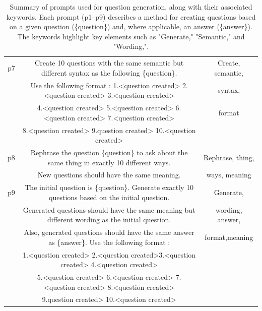 \begin{table}[!t]
{\begin{tabular}{|c|c|c|}
    p7 & Create 10 questions with the same semantic but different syntax as the following \{question\}.&Create, semantic,\\
    &Use the following format : 1.\textless{}question created\textgreater{} 2.\textless{}question created\textgreater{} 3.\textless{}question created\textgreater{}&syntax,\\
    & 4.\textless{}question created\textgreater{} 5.\textless{}question created\textgreater{} 6.\textless{}question created\textgreater{} 7.\textless{}question created\textgreater{}&format\\ 
    & 8.\textless{}question created\textgreater{} 9.\textbf{}question created\textgreater{} 10.\textless{}question created\textgreater{}&\\
    \hline

    p8 & Rephrase the question \{question\} to ask about the same thing in exactly 10 different ways.&Rephrase, thing,\\ 
    &New questions should have the same meaning.&ways, meaning\\
    \hline

    p9 & The initial question is \{question\}. Generate exactly 10 questions based on the initial question.&Generate,\\
    &Generated questions should have the same meaning but different wording as the initial question.&wording, answer,\\ 
    &Also, generated questions should have the same answer as \{answer\}. Use the following format :&format,meaning\\
    &1.\textless{}question created\textgreater{} 2.\textless{}question created\textgreater{}3.\textless{}question created\textgreater{} 4.\textless{}question created\textgreater{}&\\ 
    &5.\textless{}question created\textgreater{} 6.\textless{}question created\textgreater{} 7.\textless{}question created\textgreater{} 8.\textless{}question created\textgreater{}&\\ &9.\textbf{}question created\textgreater{} 10.\textless{}question created\textgreater{}&\\
    \hline

  \end{tabular}
  }
  \caption{Summary of prompts used for question generation, along with their associated keywords. Each prompt (p1–p9) describes a method for creating questions based on a given question (\{question\}) and, where applicable, an answer (\{answer\}). The keywords highlight key elements such as "Generate," "Semantic," and "Wording,".}
  \label{tab:prompts}
\end{table}



